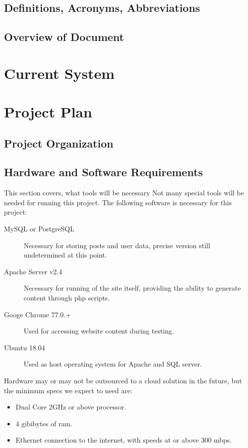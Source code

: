 \documentclass[letter,12pt]{report}
\begin{document}
\section{Definitions, Acronyms, Abbreviations}




\section{Overview of Document}




\chapter{Current System}

\chapter{Project Plan}

\section{Project Organization}

\section{Hardware and Software Requirements}

This section covers, what tools will be necessary
Not many special tools will be needed for running this project.
The following software is necessary for this project:
\begin{description}
\item [MySQL or PostgreSQL] Necessary for storing posts and user data,
precise version still undetermined at this point.
\item [Apache Server v2.4] Necessary for running of the site itself,
providing the ability to generate content through php scripts.
\item [Googe Chrome 77.0.+] Used for accessing website content during testing.
\item [Ubuntu 18.04] Used as host operating system for Apache and SQL server.
\end{description}

Hardware may or may not be outsourced to a cloud solution in the future,
but the minimum specs we expect to need are:

\begin{itemize}
\item Dual Core 2GHz or above processor.
\item 4 gibibytes of ram.
\item Ethernet connection to the internet, with speeds at or above 300 mbps.
\end{itemize}
\end{document}
